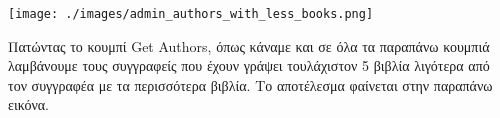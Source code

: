 \documentclass[14pt]{report}
\begin{document}
\begin{enumerate}
\begin{enumerate}
			\vspace{\baselineskip}
			
			\texttt{[image: ./images/admin\_authors\_with\_less\_books.png]}
			
			\vspace{\baselineskip}
			
			\newpage
			Πατώντας το κουμπί Get Authors, όπως κάναμε και σε όλα τα παραπάνω κουμπιά λαμβάνουμε τους συγγραφείς που έχουν γράψει τουλάχιστον 5 βιβλία λιγότερα από τον
			συγγραφέα με τα περισσότερα βιβλία. Το αποτέλεσμα φαίνεται στην παραπάνω εικόνα.
			
		\end{enumerate}
	\end{enumerate}
\end{document}
